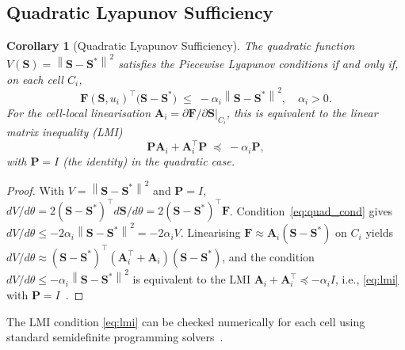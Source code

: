 \documentclass[10pt,twocolumn]{article}
\theoremstyle{plain}
\newtheorem{corollary}[theorem]{Corollary}
\theoremstyle{definition}
\theoremstyle{remark}
\newcommand{\norm}[1]{\left\|#1\right\|}
\newcommand{\Sstar}{\mathbf{S}^{*}}
\begin{document}
\subsection{Quadratic Lyapunov Sufficiency}
\label{ssec:quad}

\begin{corollary}[Quadratic Lyapunov Sufficiency]
\label{cor:quadlyap}
The quadratic function $V(\mathbf{S}) = \norm{\mathbf{S}-\Sstar}^2$
satisfies the Piecewise Lyapunov conditions if and only if, on each
cell $C_i$,
\begin{equation}
  \mathbf{F}\!\left(\mathbf{S}, u_i\right)^{\!\top}
  \bigl(\mathbf{S} - \Sstar\bigr)
  \;\leq\; -\alpha_i \norm{\mathbf{S}-\Sstar}^2,\quad \alpha_i > 0.
  \label{eq:quad_cond}
\end{equation}
For the cell-local linearisation $\mathbf{A}_i
= \partial\mathbf{F}/\partial\mathbf{S}\big|_{C_i}$, this is equivalent
to the linear matrix inequality (LMI)
\begin{equation}
  \mathbf{P}\mathbf{A}_i + \mathbf{A}_i^\top\mathbf{P}
  \;\preceq\; -\alpha_i\mathbf{P},
  \label{eq:lmi}
\end{equation}
with $\mathbf{P} = I$ (the identity) in the quadratic case.
\end{corollary}

\begin{proof}
With $V = \norm{\mathbf{S}-\Sstar}^2$ and $\mathbf{P} = I$,
$dV/d\theta
= 2(\mathbf{S}-\Sstar)^\top d\mathbf{S}/d\theta
= 2(\mathbf{S}-\Sstar)^\top \mathbf{F}$.
Condition~\eqref{eq:quad_cond} gives $dV/d\theta
\leq -2\alpha_i\norm{\mathbf{S}-\Sstar}^2
= -2\alpha_i V$.  Linearising $\mathbf{F} \approx \mathbf{A}_i(\mathbf{S}-\Sstar)$
on $C_i$ yields $dV/d\theta \approx (\mathbf{S}-\Sstar)^\top
(\mathbf{A}_i^\top + \mathbf{A}_i)(\mathbf{S}-\Sstar)$, and the
condition $dV/d\theta \leq -\alpha_i\norm{\mathbf{S}-\Sstar}^2$
is equivalent to the LMI $\mathbf{A}_i + \mathbf{A}_i^\top
\preceq -\alpha_i I$, i.e., \eqref{eq:lmi} with $\mathbf{P}=I$~\cite{Rantzer2000}.
\end{proof}

The LMI condition \eqref{eq:lmi} can be checked numerically for each
cell using standard semidefinite programming
solvers~\cite{Johansson1998}.
\end{document}
